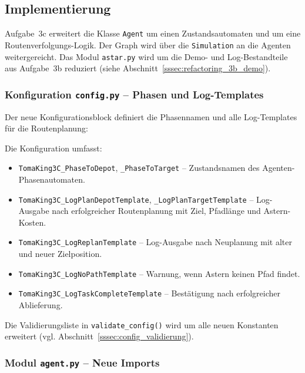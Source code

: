 \subsection{Implementierung}

Aufgabe~3c erweitert die Klasse \texttt{Agent} um einen Zustandsautomaten und um eine Routenverfolgungs-Logik. Der Graph wird über die \texttt{Simulation} an die Agenten weitergereicht. Das Modul \texttt{astar.py} wird um die Demo- und Log-Bestandteile aus Aufgabe~3b reduziert (siehe Abschnitt~\ref{sssec:refactoring_3b_demo}).


\subsubsection{Konfiguration \texttt{config.py} – Phasen und Log-Templates}

Der neue Konfigurationsblock definiert die Phasennamen und alle Log-Templates für die Routenplanung:



Die Konfiguration umfasst:
\begin{itemize}
    \item \texttt{TomaKing3C\_PhaseToDepot}, \texttt{\_PhaseToTarget} -- Zustandsnamen des Agenten-Phasenautomaten.
    \item \texttt{TomaKing3C\_LogPlanDepotTemplate}, \texttt{\_LogPlanTargetTemplate} -- Log-Ausgabe nach erfolgreicher Routenplanung mit Ziel, Pfadlänge und \acs{Astern}-Kosten.
    \item \texttt{TomaKing3C\_LogReplanTemplate} -- Log-Ausgabe nach Neuplanung mit alter und neuer Zielposition.
    \item \texttt{TomaKing3C\_LogNoPathTemplate} -- Warnung, wenn \acs{Astern} keinen Pfad findet.
    \item \texttt{TomaKing3C\_LogTaskCompleteTemplate} -- Bestätigung nach erfolgreicher Ablieferung.
\end{itemize}

Die Validierungsliste in \texttt{validate\_config()} wird um alle neuen Konstanten erweitert (vgl. Abschnitt~\ref{sssec:config_validierung}).


\subsubsection{Modul \texttt{agent.py} – Neue Imports}

